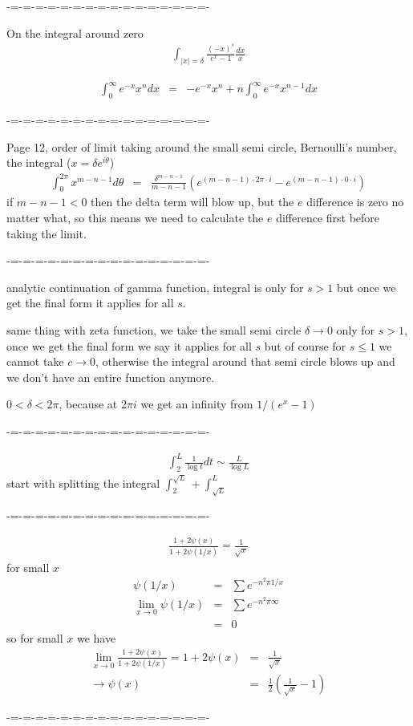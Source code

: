 \documentclass[aps,preprint,preprintnumbers,nofootinbib,showpacs,prd]{revtex4-1}
\newcommand{\nbea}{\begin{eqnarray*}}
\newcommand{\neea}{\end{eqnarray*}}
\begin{document}
-=-=-=-=-=-=-=-=-=-=-=-=-=-=-=-=-

On the integral around zero
%
\nbea
\int_{|x| = \delta} \frac{(-x)^s}{e^x-1} \frac{dx}{x}
\neea
%


%
\nbea
\int_0^\infty e^{-x}x^n dx & = & -e^{-x}x^{n} + n\int_0^\infty e^{-x}x^{n-1} dx
\neea
%

-=-=-=-=-=-=-=-=-=-=-=-=-=-=-=-=-

Page 12, order of limit taking around the small semi circle, Bernoulli's number, the integral ($x = \delta e^{i\theta}$)
%
\nbea
\int_0^{2\pi} x^{m-n-1} d\theta & = & \frac{\delta^{m-n-1}}{m-n-1} (e^{(m-n-1) \cdot 2\pi \cdot i} - e^{(m-n-1) \cdot 0 \cdot i})
\neea
%
if $m-n-1 < 0$ then the delta term will blow up, but the $e$ difference is zero no matter what, so this means we need to calculate the $e$ difference first before taking the limit.

-=-=-=-=-=-=-=-=-=-=-=-=-=-=-=-=-

analytic continuation of gamma function, integral is only for $s > 1$ but once we get the final form it applies for all $s$.

same thing with zeta function, we take the small semi circle $\delta \to 0$ only for $s > 1$, once we get the final form we say it applies for all $s$ but of course for $s \le 1$ we cannot take $c\to0$, otherwise the integral around that semi circle blows up and we don't have an entire function anymore.

$0 < \delta < 2\pi$, because at $2\pi i$ we get an infinity from $1/(e^x-1)$

-=-=-=-=-=-=-=-=-=-=-=-=-=-=-=-=-

%
\nbea
\int_2^L \frac{1}{\log t}dt \sim \frac{L}{\log L}
\neea
%
start with splitting the integral $\int_2^{\sqrt{L}} + \int_{\sqrt{L}}^{L}$

-=-=-=-=-=-=-=-=-=-=-=-=-=-=-=-=-

%
\nbea
\frac{1 + 2\psi(x)}{1 + 2\psi(1/x)} = \frac{1}{\sqrt{x}}
\neea
%
for small $x$
%
\nbea
\psi(1/x) & = & \sum e^{-n^2 \pi 1/x} \\
\lim_{x\to 0} \psi(1/x) & = & \sum e^{-n^2 \pi \infty} \\
& = & 0
\neea
%
so for small $x$ we have
%
\nbea
\lim_{x\to 0} \frac{1 + 2\psi(x)}{1 + 2\psi(1/x)} = 1 + 2\psi(x) & = & \frac{1}{\sqrt{x}} \\
\to \psi(x) & = & \frac{1}{2} \left( \frac{1}{\sqrt{x}} - 1\right)
\neea
%

-=-=-=-=-=-=-=-=-=-=-=-=-=-=-=-=-
\end{document}
